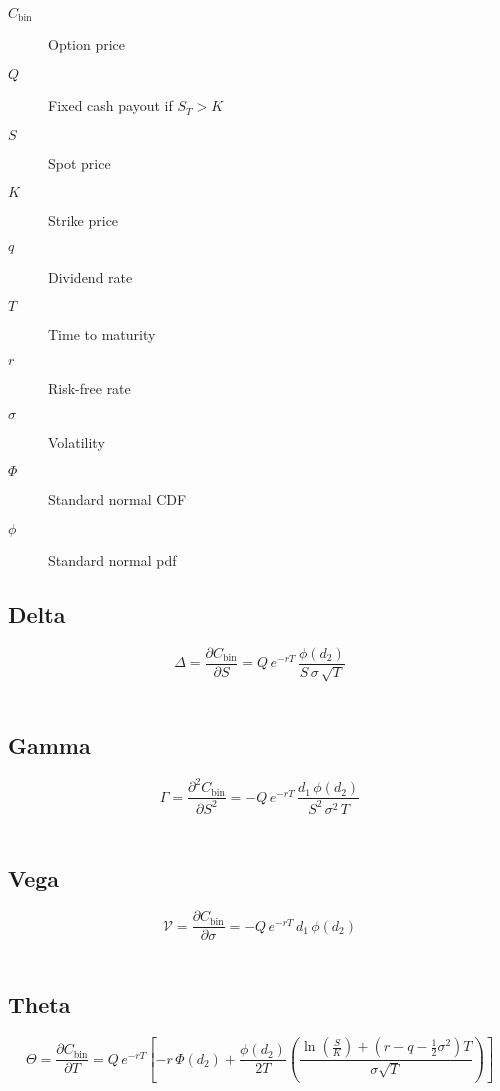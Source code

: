 \documentclass[12pt,a4paper]{article}
\begin{document}
\begin{description}
  \item[$C_{\mathrm{bin}}$] Option price
  \item[$Q$] Fixed cash payout if \( S_T > K \)
  \item[$S$] Spot price
  \item[$K$] Strike price
  \item[$q$] Dividend rate
  \item[$T$] Time to maturity
  \item[$r$] Risk-free rate
  \item[$\sigma$] Volatility
  \item[$\Phi$] Standard normal CDF
  \item[$\phi$] Standard normal pdf
\end{description}

\subsection{Delta}
\[
  \boxed{\Delta = \frac{\partial C_{\mathrm{bin}}}{\partial S} 
  = Q\, e^{-rT}\, \frac{\phi(d_2)}{S\,\sigma\,\sqrt{T}}}
\]

\[
  \begin{aligned}
  \end{aligned}
\]

\subsection{Gamma}
\[
  \boxed{\Gamma = \frac{\partial^2 C_{\mathrm{bin}}}{\partial S^2} 
  = -Q\, e^{-rT}\, \frac{d_1\,\phi(d_2)}{S^2\,\sigma^2\,T}}
\]

\[
  \begin{aligned}
  \end{aligned}
\]

\subsection{Vega}
\[
  \boxed{\mathcal{V} = \frac{\partial C_{\mathrm{bin}}}{\partial \sigma} 
  = -Q\, e^{-rT}\, d_1\,\phi(d_2)}
\]

\[
  \begin{aligned}
  \end{aligned}
\]

\subsection{Theta}
\[
  \boxed{\Theta = \frac{\partial C_{\mathrm{bin}}}{\partial T}
  = Q\, e^{-rT}\!\left[
  -r\,\Phi(d_2) 
  + \frac{\phi(d_2)}{2T}
    \left(
      \frac{\ln(\tfrac{S}{K}) + (r - q - \tfrac{1}{2}\sigma^2)T}{\sigma\sqrt{T}}
    \right)
  \right]}
\]
\end{document}
